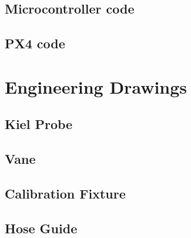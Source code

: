 \documentclass[10pt,onecolumn]{article}
\begin{document}
	\subsection{Microcontroller code}
	
	\subsection{PX4 code}

\section{Engineering Drawings}

	\subsection{Kiel Probe}
	
	\subsection{Vane}
	
	\subsection{Calibration Fixture}
	
	\subsection{Hose Guide}
	
\end{document}
